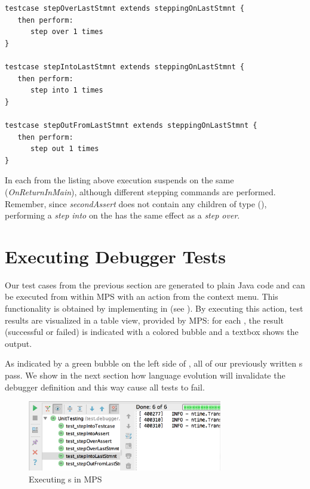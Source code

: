 \begin{lstlisting}[language=testingDSL,
caption=Test stepping commands on last \ic{Statemet} in \ic{Testcase}] 
testcase stepOverLastStmnt extends steppingOnLastStmnt { 
   then perform:                         
      step over 1 times                            
}

testcase stepIntoLastStmnt extends steppingOnLastStmnt {            
   then perform:                         
      step into 1 times                            
}

testcase stepOutFromLastStmnt extends steppingOnLastStmnt {            
   then perform:                         
      step out 1 times                            
}
\end{lstlisting}		

In each  from the listing above execution suspends on the
same  (\emph{OnReturnInMain}), although different stepping
commands are performed. Remember, since \emph{secondAssert} does not contain
any children of type  (\eg {}), performing a
\emph{step into} on the  has the same effect as
a \emph{step over}.

\section{Executing Debugger Tests}

Our test cases from the previous section are generated to plain Java code and
can be executed from within \ac{MPS} with an action from the
context menu. This functionality is obtained by implementing  in
 (see ).
By executing this action, test results are visualized in a table view, provided
by \ac{MPS}: for each , the result (successful or
failed) is indicated with a colored bubble and a textbox shows the output.

As indicated by a green bubble on the left side of , all
of our previously written s pass. 
We show in the next section how language evolution will invalidate the debugger
definition and this way cause all tests to fail.

\begin{figure}[h]
	\vspace{-2mm}
	\centering
    \includegraphics[width=8.5cm]{./figures/debuggerTestExec.png} 
    \vspace{-3mm}
	\caption{Executing s in \ac{MPS}}
	\label{fig:TestExecution1}
	\vspace{-3mm}
\end{figure}